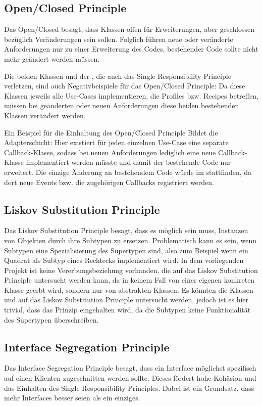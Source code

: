 \subsection{Open/Closed Principle}
Das Open/Closed besagt, dass Klassen offen für Erweiterungen, aber geschlossen bezüglich Veränderungen sein sollen. Folglich führen neue oder veränderte Anforderungen nur zu einer Erweiterung des Codes, bestehender Code sollte nicht mehr geändert werden müssen.

Die beiden Klassen  und der , die auch das Single Responsibility Principle verletzen, sind auch Negativbeispiele für das Open/Closed Principle: Da diese Klassen jeweils alle Use-Cases implementieren, die Profiles bzw. Recipes betreffen, müssen bei geänderten oder neuen Anforderungen diese beiden bestehenden Klassen verändert werden.

Ein Beispiel für die Einhaltung des Open/Closed Principle Bildet die Adapterschicht: Hier existiert für jeden einzelnen Use-Case eine separate Callback-Klasse, sodass bei neuen Anforderungen lediglich eine neue Callback-Klasse implementiert werden müsste und damit der bestehende Code nur erweitert. Die einzige Änderung an bestehendem Code würde im  stattfinden, da dort neue Events bzw. die zugehörigen Callbacks registriert werden.

\subsection{Liskov Substitution Principle}
Das Liskov Substitution Principle besagt, dass es möglich sein muss, Instanzen von Objekten durch ihre Subtypen zu ersetzen. Problematisch kann es sein, wenn Subtypen eine Spezialisierung des Supertypen sind, also zum Beispiel wenn ein Quadrat als Subtyp eines Rechtecks implementiert wird. In dem vorliegenden Projekt ist keine Vererbungsbeziehung vorhanden, die auf das Liskov Substitution Principle untersucht werden kann, da in keinem Fall von einer eigenen konkreten Klasse geerbt wird, sondern nur von abstrakten Klassen. Es könnten die Klassen  und  auf das Liskov Substitution Principle untersucht werden, jedoch ist es hier trivial, dass das Prinzip eingehalten wird, da die Subtypen keine Funktionalität des Supertypen überschreiben.

\subsection{Interface Segregation Principle}
Das Interface Segregation Principle besagt, dass ein Interface möglichst spezifisch auf einen Klienten zugeschnitten werden sollte. Dieses fördert hohe Kohäsion und das Einhalten des Single Responsibility Principles. Dabei ist ein Grundsatz, dass mehr Interfaces besser seien als ein einziges.

